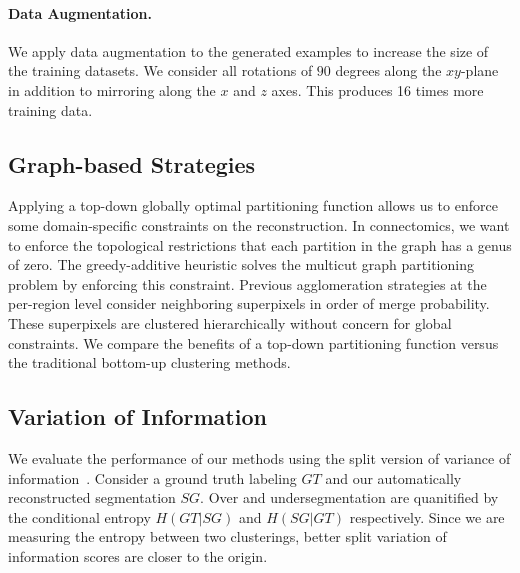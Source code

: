 \paragraph{Data Augmentation.}
We apply data augmentation to the generated examples to increase the size of the training datasets. 
We consider all rotations of $90$ degrees along the $xy$-plane in addition to mirroring along the $x$ and $z$ axes. 
This produces 16 times more training data. 

\subsection{Graph-based Strategies}

Applying a top-down globally optimal partitioning function allows us to enforce some domain-specific constraints on the reconstruction.
In connectomics, we want to enforce the topological restrictions that each partition in the graph has a genus of zero. 
The greedy-additive heuristic solves the multicut graph partitioning problem by enforcing this constraint.
Previous agglomeration strategies at the per-region level consider neighboring superpixels in order of merge probability. 
These superpixels are clustered hierarchically without concern for global constraints.
We compare the benefits of a top-down partitioning function versus the traditional bottom-up clustering methods.

\subsection{Variation of Information}
\label{sec:variation-of-information}
We evaluate the performance of our methods using the split version of variance of information~\cite{meila2003comparing}. 
Consider a ground truth labeling $GT$ and our automatically reconstructed segmentation $SG$. 
Over and undersegmentation are quanitified by the conditional entropy $H(GT | SG)$ and $H(SG | GT)$ respectively. 
Since we are measuring the entropy between two clusterings, better split variation of information scores are closer to the origin.